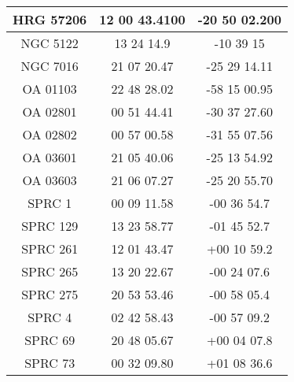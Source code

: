 \begin{apendicesenv}
\begin{longtable}{|c|c|c|}
            HRG 57206 & 12 00 43.4100 & -20 50 02.200 \\ \hline
            NGC 5122 & 13 24 14.9 & -10 39 15 \\ \hline
            NGC 7016 & 21 07 20.47 & -25 29 14.11 \\ \hline
            OA 01103 & 22 48 28.02 & -58 15 00.95 \\ \hline
            OA 02801 & 00 51 44.41 & -30 37 27.60 \\ \hline
            OA 02802 & 00 57 00.58 & -31 55 07.56 \\ \hline
            OA 03601 & 21 05 40.06 & -25 13 54.92 \\ \hline
            OA 03603 & 21 06 07.27 & -25 20 55.70 \\ \hline
            SPRC 1 & 00 09 11.58 & -00 36 54.7 \\ \hline
            SPRC 129 & 13 23 58.77 & -01 45 52.7 \\ \hline
            SPRC 261 & 12 01 43.47 & +00 10 59.2 \\ \hline
            SPRC 265 & 13 20 22.67 & -00 24 07.6 \\ \hline
            SPRC 275 & 20 53 53.46 & -00 58 05.4 \\ \hline
            SPRC 4 & 02 42 58.43 & -00 57 09.2 \\ \hline
            SPRC 69 & 20 48 05.67 & +00 04 07.8 \\ \hline
            SPRC 73 & 00 32 09.80 & +01 08 36.6 \\ \hline
        \end{longtable}

\end{apendicesenv}